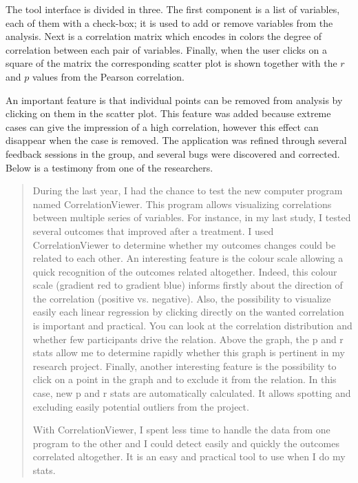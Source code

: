 The tool interface is divided in three. The first component is a list of variables, each of them with a check-box; it is used to add or remove variables from the analysis. Next is a correlation matrix which encodes in colors the degree of correlation between each pair of variables. Finally, when the user clicks on a square of the matrix the corresponding scatter plot is shown together with the $r$ and $p$ values from the Pearson correlation. 

An important feature is that individual points can be removed from analysis by clicking on them in the scatter plot. This feature was added because extreme cases can give the impression of a high correlation, however this effect can disappear when the case is removed. The application was refined through several feedback sessions in the group, and several bugs were discovered and corrected.  Below is a testimony from one of the researchers.

\begin{quote}
During the last year, I had the chance to test the new computer program named CorrelationViewer. This program allows visualizing correlations between multiple series of variables. For instance, in my last study, I tested several outcomes that improved after a treatment. I used CorrelationViewer to determine whether my outcomes changes could be related to each other. An interesting feature is the colour scale allowing a quick recognition of the outcomes related altogether. Indeed, this colour scale (gradient red to gradient blue) informs firstly about the direction of the correlation (positive vs. negative). Also, the possibility to visualize easily each linear regression by clicking directly on the wanted correlation is important and practical. You can look at the correlation distribution and whether few participants drive the relation. Above the graph, the p and r stats allow me to determine rapidly whether this graph is pertinent in my research project. Finally, another interesting feature is the possibility to click on a point in the graph and to exclude it from the relation. In this case, new p and r stats are automatically calculated. It allows spotting and excluding easily potential outliers from the project.

With CorrelationViewer, I spent less time to handle the data from one program to the other and I could detect easily and quickly the outcomes correlated altogether. It is an easy and practical tool to use when I do my stats. 
\end{quote}

